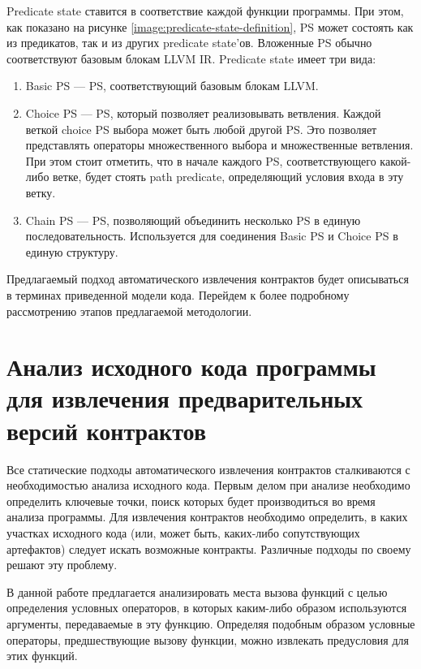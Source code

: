 Predicate state ставится в соответствие каждой функции программы. При этом, как показано на рисунке \ref{image:predicate-state-definition}, PS может состоять как из предикатов, так и из других predicate state'ов. Вложенные PS обычно соответствуют базовым блокам LLVM IR. Predicate state имеет три вида:
\begin{enumerate}
\item Basic PS --- PS, соответствующий базовым блокам LLVM.
\item Choice PS --- PS, который позволяет реализовывать ветвления. Каждой веткой choice PS выбора может быть любой другой PS. Это позволяет представлять операторы множественного выбора и множественные ветвления. При этом стоит отметить, что в начале каждого PS, соответствующего какой-либо ветке, будет стоять path predicate, определяющий условия входа в эту ветку.
\item Chain PS --- PS, позволяющий объединить несколько PS в единую последовательность. Используется для соединения Basic PS и Choice PS в единую структуру.
\end{enumerate}

Предлагаемый подход автоматического извлечения контрактов будет описываться в терминах приведенной модели кода. Перейдем к более подробному рассмотрению этапов предлагаемой методологии.

\section{Анализ исходного кода программы для извлечения предварительных версий контрактов}
\label{section:analysis}
Все статические подходы автоматического извлечения контрактов сталкиваются с необходимостью анализа исходного кода. Первым делом при анализе необходимо определить ключевые точки, поиск которых будет производиться во время анализа программы. Для извлечения контрактов необходимо определить, в каких участках исходного кода (или, может быть, каких-либо сопутствующих артефактов) следует искать возможные контракты. Различные подходы по своему решают эту проблему.

В данной работе предлагается анализировать места вызова функций с целью определения условных операторов, в которых каким-либо образом используются аргументы, передаваемые в эту функцию. Определяя подобным образом условные операторы, предшествующие вызову функции, можно извлекать предусловия для этих функций.

